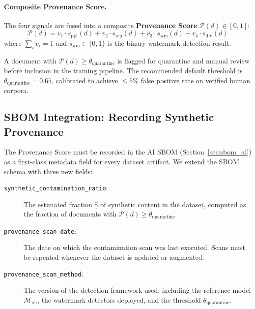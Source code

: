 \paragraph{Composite Provenance Score.}
The four signals are fused into a composite
\textbf{Provenance Score} $\mathcal{P}(d) \in [0, 1]$:
\begin{equation}
  \label{eq:provenance-score}
  \mathcal{P}(d)
    = v_1 \cdot s_{\mathrm{ppl}}(d)
    + v_2 \cdot s_{\mathrm{rep}}(d)
    + v_3 \cdot s_{\mathrm{wm}}(d)
    + v_4 \cdot s_{\mathrm{div}}(d)
\end{equation}
where $\sum_i v_i = 1$ and $s_{\mathrm{wm}} \in \{0, 1\}$
is the binary watermark detection result.

A document with $\mathcal{P}(d) \geq \theta_{\mathrm{quarantine}}$
is flagged for quarantine and manual review before inclusion
in the training pipeline.
The recommended default threshold is
$\theta_{\mathrm{quarantine}} = 0.65$, calibrated to achieve
$\leq 5\%$ false positive rate on verified human corpora.

\subsection{SBOM Integration: Recording Synthetic Provenance}
\label{subsec:sbom-synthetic-provenance}

The Provenance Score must be recorded in the AI SBOM
(Section~\ref{sec:sbom_ai}) as a first-class metadata field
for every dataset artifact.
We extend the SBOM schema with three new fields:

\begin{description}
  \item[\texttt{synthetic\_contamination\_ratio}:]
    The estimated fraction $\hat{\gamma}$ of synthetic content
    in the dataset, computed as the fraction of documents with
    $\mathcal{P}(d) \geq \theta_{\mathrm{quarantine}}$.

  \item[\texttt{provenance\_scan\_date}:]
    The date on which the contamination scan was last executed.
    Scans must be repeated whenever the dataset is updated or
    augmented.

  \item[\texttt{provenance\_scan\_method}:]
    The version of the detection framework used, including the
    reference model $\mathcal{M}_{\mathrm{ref}}$, the watermark
    detectors deployed, and the threshold
    $\theta_{\mathrm{quarantine}}$.
\end{description}

